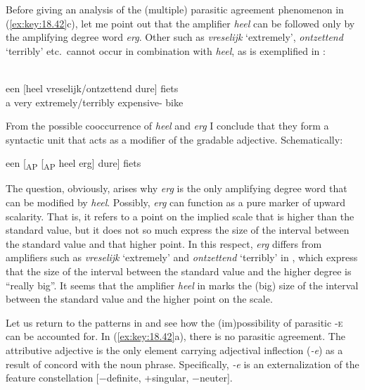 \documentclass[output=paper]{langsci/langscibook}
\begin{document}
Before giving an analysis of the (multiple) parasitic
agreement phenomenon in
(\ref{ex:key:18.42}c), let me point out that the amplifier \emph{heel} can be
followed only by the amplifying degree word \emph{erg}. Other
 such as \emph{vreselijk} \enquote*{extremely},
\emph{ontzettend} \enquote*{terribly} etc.\ cannot occur in combination with
\emph{heel}, as is exemplified in :

\ea%
    \label{ex:key:18.43}\\
    \gll \llap{*}een    [heel  vreselijk/ontzettend    dure]              fiets\\
        a            very    extremely/terribly  expensive-\Agr{}  bike\\
\z

From the possible cooccurrence of \emph{heel} and \emph{erg} I conclude that
they form a syntactic unit that acts as a modifier of the gradable adjective.
Schematically:

\ea%
    \label{ex:key:18.44}
    een [\textsubscript{AP} [\textsubscript{AP} heel erg] dure] fiets
\z

The question, obviously, arises why \emph{erg} is the only amplifying degree
word that can be modified by \emph{heel}. Possibly, \emph{erg} can function as
a pure marker of upward scalarity. That is, it refers to a point on the implied
scale that is higher than the standard value, but it does not so much express
the size of the interval between the standard value and that higher point. In
this respect, \emph{erg} differs from amplifiers such as \emph{vreselijk}
\enquote*{extremely} and \emph{ontzettend} \enquote*{terribly} in
, which express that the size of the interval between the
standard value and the higher degree is \enquote{really big}. It seems that the
amplifier \emph{heel} in  marks the (big) size of the interval
between the standard value and the higher point on the scale.

Let us return to the patterns in  and see how the
(im)possibility of parasitic \textsc{-e} can be accounted for. In
(\ref{ex:key:18.42}a), there is no parasitic agreement. The attributive adjective is
the only element carrying adjectival inflection (\emph{-e}) as a result of
concord with the noun phrase. Specifically, \emph{-e} is an externalization of
the feature constellation [−definite, +singular, −neuter].
\end{document}
